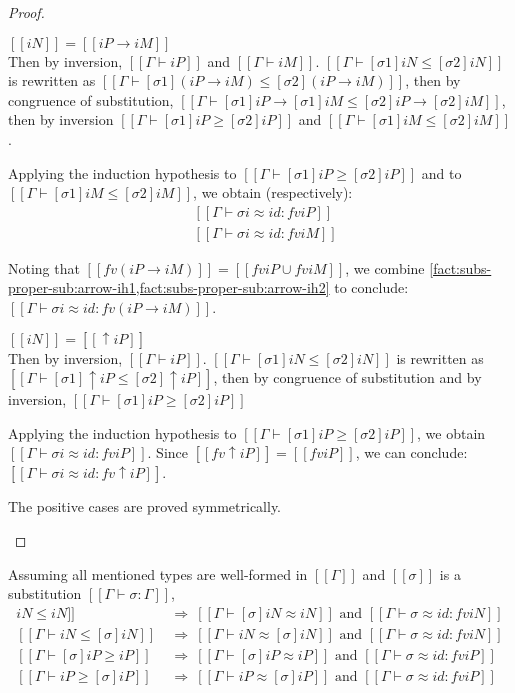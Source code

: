 \begin{proof}
\begin{caseof}
  \item $[[iN]] = [[iP → iM]]$\\
    Then by inversion, $[[Γ ⊢ iP]]$ and $[[Γ ⊢ iM]]$.
    $[[Γ ⊢ [σ1]iN ≤ [σ2]iN]]$ is rewritten as
    $[[Γ ⊢ [σ1](iP → iM) ≤ [σ2](iP → iM)]]$,
    then by congruence of substitution,
    $[[Γ ⊢ [σ1]iP → [σ1]iM ≤ [σ2]iP → [σ2]iM]]$,
    then by inversion
    $[[Γ ⊢ [σ1]iP ≥ [σ2]iP]]$
    and
    $[[Γ ⊢ [σ1]iM ≤ [σ2]iM]]$.

    Applying the induction hypothesis to $[[Γ ⊢ [σ1]iP ≥ [σ2]iP]]$
    and to $[[Γ ⊢ [σ1]iM ≤ [σ2]iM]]$, we obtain (respectively):
    \begin{align}
      &[[Γ ⊢ σi ≈ id :  fv iP]] \label{fact:subs-proper-sub:arrow-ih1}\\
      &[[Γ ⊢ σi ≈ id :  fv iM]] \label{fact:subs-proper-sub:arrow-ih2}
    \end{align}

    Noting that $[[fv (iP → iM)]] = [[fv iP ∪ fv iM]]$,
    we combine
    \cref{fact:subs-proper-sub:arrow-ih1,fact:subs-proper-sub:arrow-ih2}
    to conclude:
    $[[Γ ⊢ σi ≈ id :  fv (iP → iM)]]$.

  \item $[[iN]] = [[↑iP]]$\\
    Then by inversion, $[[Γ ⊢ iP]]$.
    $[[Γ ⊢ [σ1]iN ≤ [σ2]iN]]$ is rewritten as
    $[[Γ ⊢ [σ1]↑iP ≤ [σ2]↑iP]]$,
    then by congruence of substitution and by inversion,
    $[[Γ ⊢ [σ1]iP ≥ [σ2]iP]]$

    Applying the induction hypothesis to $[[Γ ⊢ [σ1]iP ≥ [σ2]iP]]$, we obtain
    $[[Γ ⊢ σi ≈ id :  fv iP]]$. Since $[[fv ↑iP]] = [[fv iP]]$, we can
    conclude: $[[Γ ⊢ σi ≈ id :  fv ↑iP]]$.
  \item The positive cases are proved symmetrically.
  \end{caseof}
\end{proof}

\begin{corollary} \label{corollary:subst-proper-subt}
  Assuming all mentioned types are well-formed in $[[Γ]]$ and $[[σ]]$ is a
  substitution $[[Γ ⊢ σ : Γ]]$,
  \begin{align*}
    [[Γ ⊢ [σ]iN ≤ iN]] ~&\Rightarrow~ [[Γ ⊢ [σ]iN ≈ iN]]
                          \text{ and } [[Γ ⊢ σ ≈ id :  fv iN]] \\
    [[Γ ⊢ iN ≤ [σ]iN]] ~&\Rightarrow~ [[Γ ⊢ iN ≈ [σ]iN]]
                          \text{ and } [[Γ ⊢ σ ≈ id :  fv iN]] \\
    [[Γ ⊢ [σ]iP ≥ iP]] ~&\Rightarrow~ [[Γ ⊢ [σ]iP ≈ iP]]
                          \text{ and } [[Γ ⊢ σ ≈ id :  fv iP]] \\
    [[Γ ⊢ iP ≥ [σ]iP]] ~&\Rightarrow~ [[Γ ⊢ iP ≈ [σ]iP]]
                          \text{ and } [[Γ ⊢ σ ≈ id :  fv iP]] \\
  \end{align*}
\end{corollary}


